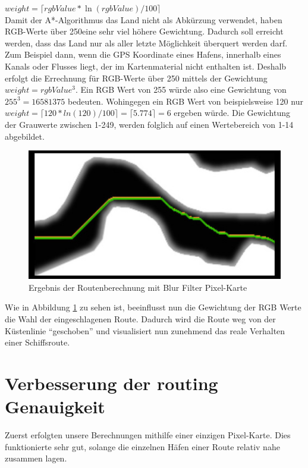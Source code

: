 \documentclass[letterpaper]{article}
\begin{document}
			$weight = \lceil rgbValue * \ln{(rgbValue)/100} \rceil$\\

			Damit der A*-Algorithmus das Land nicht als Abkürzung verwendet, haben RGB-Werte über 250\footnotemark eine sehr viel höhere Gewichtung. Dadurch soll erreicht werden, dass das Land nur als aller letzte Möglichkeit überquert werden darf. Zum Beispiel dann, wenn die GPS Koordinate eines Hafens, innerhalb eines Kanals oder Flusses liegt, der im Kartenmaterial nicht enthalten ist. Deshalb erfolgt die Errechnung für RGB-Werte über 250 mittels der Gewichtung $weight = rgbValue^3$. Ein RGB Wert von 255 würde also eine Gewichtung von $255^3 = 16581375$ bedeuten. Wohingegen ein RGB Wert von beispielsweise 120 nur $ weight = \lceil 120 * ln(120)/100 \rceil = \lceil 5.774 \rceil = 6 $ ergeben würde. Die Gewichtung der Grauwerte zwischen 1-249, werden folglich auf einen Wertebereich von 1-14 abgebildet.\\


			\begin{figure}[!htbp]
				\centering
				\includegraphics[width=0.7\linewidth]{route_after_blur}
				\caption{Ergebnis der Routenberechnung mit Blur Filter Pixel-Karte}
				\label{fig:route_after_blur}
			\end{figure}

			Wie in Abbildung \ref{fig:route_after_blur} zu sehen ist, beeinflusst nun die Gewichtung der RGB Werte die Wahl der eingeschlagenen Route. Dadurch wird die Route weg von der Küstenlinie "`geschoben"' und visualisiert nun zunehmend das reale Verhalten einer Schiffsroute.

\section{Verbesserung der routing Genauigkeit}
	Zuerst erfolgten unsere Berechnungen mithilfe einer einzigen Pixel-Karte. Dies funktionierte sehr gut, solange die einzelnen Häfen einer Route relativ nahe zusammen lagen.
\end{document}
